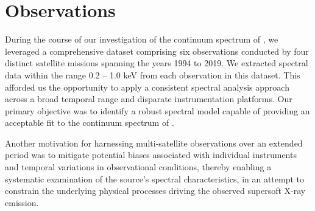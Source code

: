 \section{Observations}
	During the course of our investigation of the continuum spectrum of \source, we leveraged a comprehensive dataset comprising six observations conducted by four distinct satellite missions spanning the years 1994 to 2019. We extracted spectral data within the range 0.2 -- 1.0 keV from each observation in this dataset. This afforded us the opportunity to apply a consistent spectral analysis approach across a broad temporal range and disparate instrumentation platforms. Our primary objective was to identify a robust spectral model capable of providing an acceptable fit to the continuum spectrum of \source.
	
	Another motivation for harnessing multi-satellite observations over an extended period was to mitigate potential biases associated with individual instruments and temporal variations in observational conditions, thereby enabling a systematic examination of the source's spectral characteristics, in an attempt to constrain the underlying physical processes driving the observed supersoft X-ray emission.
	

